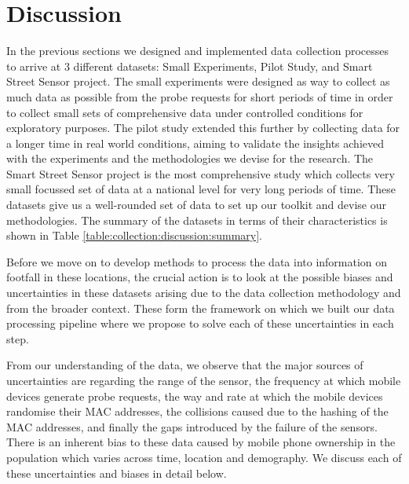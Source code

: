 \section{Discussion} \label{section:uncertainties}
In the previous sections we designed and implemented data collection processes to arrive at 3 different datasets: Small Experiments, Pilot Study, and Smart Street Sensor project. 
The small experiments were designed as way to collect as much data as possible from the probe requests for short periods of time in order to collect small sets of comprehensive data under controlled conditions for exploratory purposes.
The pilot study extended this further by collecting data for a longer time in real world conditions, aiming to validate the insights achieved with the experiments and the methodologies we devise for the research.
The Smart Street Sensor project is the most comprehensive study which collects very small focussed set of data at a national level for very long periods of time.
These datasets give us a well-rounded set of data to set up our toolkit and devise our methodologies.
The summary of the datasets in terms of their characteristics is shown in Table \ref{table:collection:discussion:summary}.

Before we move on to develop methods to process the data into information on footfall in these locations, the crucial action is to look at the possible biases and uncertainties in these datasets arising due to the data collection methodology and from the broader context.
These form the framework on which we built our data processing pipeline where we propose to solve each of these uncertainties in each step.

From our understanding of the data, we observe that the major sources of uncertainties are regarding the range of the sensor, the frequency at which mobile devices generate probe requests, the way and rate at which the mobile devices randomise their MAC addresses, the collisions caused due to the hashing of the MAC addresses, and finally the gaps introduced by the failure of the sensors.
There is an inherent bias to these data caused by mobile phone ownership in the population which varies across time, location and demography.
We discuss each of these uncertainties and biases in detail below.

